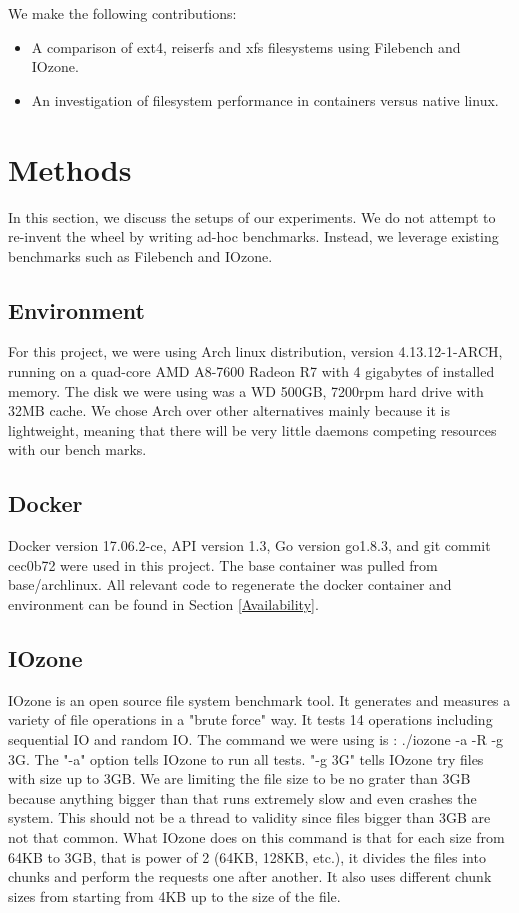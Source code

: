 \documentclass[letterpaper,twocolumn,10pt]{article}
\begin{document}
We make the following contributions:
\begin{itemize}
  \item A comparison of ext4, reiserfs and xfs filesystems using Filebench and IOzone.
  \item An investigation of filesystem performance in containers versus native linux.
\end{itemize}

\section{Methods}
In this section, we discuss the setups of our experiments. We do not attempt to re-invent the wheel by writing ad-hoc benchmarks. Instead, we leverage existing benchmarks such as Filebench and IOzone.

\subsection{Environment}
For this project, we were using Arch linux distribution, version 4.13.12-1-ARCH, running on a quad-core AMD A8-7600 Radeon R7 with 4 gigabytes
 of installed memory. The disk we were using was a WD 500GB, 7200rpm hard drive with 32MB cache. We chose Arch over other alternatives 
 mainly because it is lightweight, meaning that there will be very little daemons competing resources with our bench marks. 

\subsection{Docker}
Docker version 17.06.2-ce, API version 1.3, Go version go1.8.3, and git commit cec0b72 were used in this project. The base container was pulled from base/archlinux. All relevant code to regenerate the docker container and environment can be found in Section \ref{Availability}.

\subsection{IOzone}
IOzone is an open source file system benchmark tool. It generates and measures a variety of file operations in a "brute force" way. It tests 
14 operations including sequential IO and random IO. The command we were using is : ./iozone -a -R -g 3G. The "-a" option tells IOzone
to run all tests. "-g 3G" tells IOzone try files with size up to 3GB. We are limiting the file size to be no grater than 3GB because anything
bigger than that runs extremely slow and even crashes the system. This should not be a thread to validity since files bigger than 3GB are not 
that common. What IOzone does on this command is that for each size from 64KB to 3GB, that is power of 2 (64KB, 128KB, etc.), it divides the 
files into chunks and perform the requests one after another. It also uses different chunk sizes from starting from 4KB up to the size of the file. 
\end{document}
